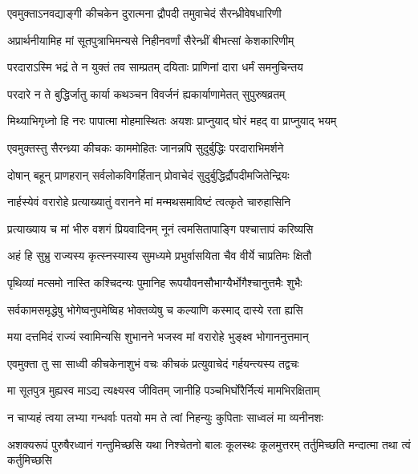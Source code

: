 \twolineshloka
{एवमुक्ताऽनवद्याङ्गी कीचकेन दुरात्मना}
{द्रौपदी तमुवाचेदं सैरन्ध्रीवेषधारिणी}


\twolineshloka
{अप्रार्थनीयामिह मां सूतपुत्राभिमन्यसे}
{निहीनवर्णां सैरेन्ध्रीं बीभत्सां केशकारिणीम्}


\twolineshloka
{परदाराऽस्मि भद्रं ते न युक्तं तव साम्प्रतम्}
{दयिताः प्राणिनां दारा धर्मं समनुचिन्तय}


\twolineshloka
{परदारे न ते बुद्धिर्जातु कार्या कथञ्चन}
{विवर्जनं ह्यकार्याणामेतत् सुपुरुषव्रतम्}


\twolineshloka
{मिथ्याभिगृध्नो हि नरः पापात्मा मोहमास्थितः}
{अयशः प्राप्नुयाद् घोरं महद् वा प्राप्नुयाद् भयम्}



\twolineshloka
{एवमुक्तस्तु सैरन्ध्र्या कीचकः काममोहितः}
{जानन्नपि सुदुर्बुद्धिः परदाराभिमर्शने}


\twolineshloka
{दोषान् बहून् प्राणहरान् सर्वलोकविगर्हितान्}
{प्रोवाचेदं सुदुर्बुद्धिर्द्रौपदीमजितेन्द्रियः}


\twolineshloka
{नार्हस्येवं वरारोहे प्रत्याख्यातुं वरानने}
{मां मन्मथसमाविष्टं त्वत्कृते चारुहासिनि}


\twolineshloka
{प्रत्याख्याय च मां भीरु वशगं प्रियवादिनम्}
{नूनं त्वमसितापाङ्गि पश्चात्तापं करिष्यसि}


\twolineshloka
{अहं हि सुभ्रु राज्यस्य कृत्स्नस्यास्य सुमध्यमे}
{प्रभुर्वासयिता चैव वीर्ये चाप्रतिमः क्षितौ}


\twolineshloka
{पृथिव्यां मत्समो नास्ति कश्चिदन्यः पुमानिह}
{रूपयौवनसौभाग्यैर्भोगैश्चानुत्तमैः शुभैः}


\twolineshloka
{सर्वकामसमृद्धेषु भोगेष्वनुपमेष्विह}
{भोक्तव्येषु च कल्याणि कस्माद् दास्ये रता ह्यसि}


\twolineshloka
{मया दत्तमिदं राज्यं स्वामिन्यसि शुभानने}
{भजस्व मां वरारोहे भुङ्क्ष्व भोगाननुत्तमान्}


\twolineshloka
{एवमुक्ता तु सा साध्वी कीचकेनाशुभं वचः}
{कीचकं प्रत्युवाचेदं गर्हयन्त्यस्य तद्वचः}




\twolineshloka
{मा सूतपुत्र मुह्यस्व माऽद्य त्यक्ष्यस्व जीवितम्}
{जानीहि पञ्चभिर्घोरैर्नित्यं मामभिरक्षिताम्}


\twolineshloka
{न चाप्यहं त्वया लभ्या गन्धर्वाः पतयो मम}
{ते त्वां निहन्युः कुपिताः साध्वलं मा व्यनीनशः}


\threelineshloka
{अशक्यरूपं पुरुषैरध्वानं गन्तुमिच्छसि}
{यथा निश्चेतनो बालः कूलस्थः कूलमुत्तरम्}
{तर्तुमिच्छति मन्दात्मा तथा त्वं कर्तुमिच्छसि}


